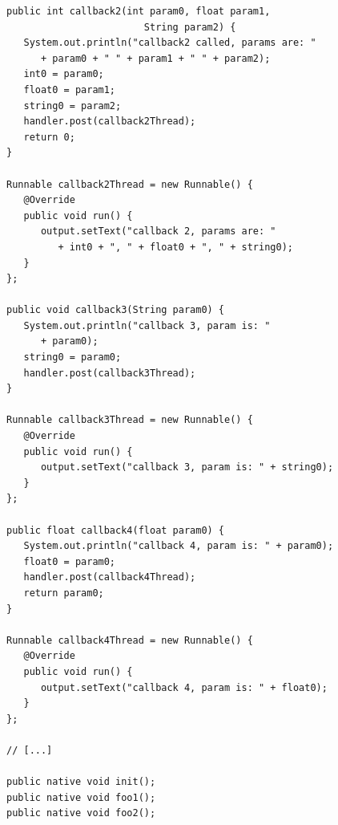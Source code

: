\documentclass[a4paper,10pt]{article}
\begin{document}
\begin{multicols}{2}
\begin{lstlisting}
public int callback2(int param0, float param1,
                        String param2) {
   System.out.println("callback2 called, params are: "
      + param0 + " " + param1 + " " + param2);
   int0 = param0;
   float0 = param1;
   string0 = param2;
   handler.post(callback2Thread);
   return 0;
}

Runnable callback2Thread = new Runnable() {
   @Override
   public void run() {
      output.setText("callback 2, params are: "
         + int0 + ", " + float0 + ", " + string0);
   }
};

public void callback3(String param0) {
   System.out.println("callback 3, param is: "
      + param0);
   string0 = param0;
   handler.post(callback3Thread);
}

Runnable callback3Thread = new Runnable() {
   @Override
   public void run() {
      output.setText("callback 3, param is: " + string0);
   }
};

public float callback4(float param0) {
   System.out.println("callback 4, param is: " + param0);
   float0 = param0;
   handler.post(callback4Thread);
   return param0;
}

Runnable callback4Thread = new Runnable() {
   @Override
   public void run() {
      output.setText("callback 4, param is: " + float0);
   }
};

// [...]

public native void init();
public native void foo1();
public native void foo2();


\end{lstlisting}
\end{multicols}
\end{document}
